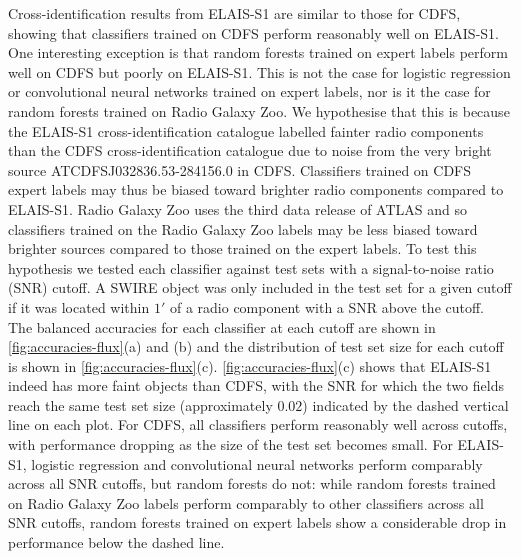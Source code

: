 \documentclass[fleqn,usenatbib,usedcolumn]{mnras}
\begin{document}
  Cross-identification results from ELAIS-S1 are similar to those for CDFS,
  showing that classifiers trained on CDFS perform reasonably well on
  ELAIS-S1. One interesting exception is that random forests trained on expert
  labels perform well on CDFS but poorly on ELAIS-S1. This is not the case for
  logistic regression or convolutional neural networks trained on expert
  labels, nor is it the case for random forests trained on Radio Galaxy Zoo.
  We hypothesise that this is because the ELAIS-S1 cross-identification
  catalogue \citep{middelberg08} labelled fainter radio components than the
  CDFS cross-identification catalogue \citep{norris06} due to noise from the
  very bright source ATCDFS\textunderscore{}J032836.53-284156.0 in CDFS.
  Classifiers trained on CDFS expert labels may thus be biased toward brighter
  radio components compared to ELAIS-S1. Radio Galaxy Zoo uses the third data
  release of ATLAS \citep{franzen15} and so classifiers trained on the Radio
  Galaxy Zoo labels may be less biased toward brighter sources compared to
  those trained on the expert labels. To test this hypothesis we tested each
  classifier against test sets with a signal-to-noise ratio (SNR) cutoff. A
  SWIRE object was only included in the test set for a given cutoff if it was
  located within $1'$ of a radio component with a SNR above the cutoff. The
  balanced accuracies for each classifier at each cutoff are shown in
  \autoref{fig:accuracies-flux}(a) and (b) and the distribution of test set
  size for each cutoff is shown in \autoref{fig:accuracies-flux}(c).
  \autoref{fig:accuracies-flux}(c) shows that ELAIS-S1 indeed has more faint
  objects than CDFS, with the SNR for which the two fields reach the same test
  set size (approximately $0.02$) indicated by the dashed vertical line on
  each plot. For CDFS, all classifiers perform reasonably well across cutoffs,
  with performance dropping as the size of the test set becomes small. For
  ELAIS-S1, logistic regression and convolutional neural networks perform
  comparably across all SNR cutoffs, but random forests do not: while random
  forests trained on Radio Galaxy Zoo labels perform comparably to other
  classifiers across all SNR cutoffs, random forests trained on expert labels
  show a considerable drop in performance below the dashed line.
\end{document}
